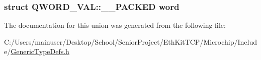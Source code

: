 \subsubsection[{word}]{\setlength{\rightskip}{0pt plus 5cm}struct {\bf Q\+W\+O\+R\+D\+\_\+\+V\+A\+L\+::\+\_\+\+\_\+\+P\+A\+C\+K\+E\+D}  word}\label{union_q_w_o_r_d___v_a_l_a39f0ae6958f94a2d2e6b49293c9e6f1c}


The documentation for this union was generated from the following file\+:\begin{DoxyCompactItemize}
\item 
C\+:/\+Users/mainuser/\+Desktop/\+School/\+Senior\+Project/\+Eth\+Kit\+T\+C\+P/\+Microchip/\+Include/\hyperlink{_generic_type_defs_8h}{Generic\+Type\+Defs.\+h}\end{DoxyCompactItemize}
